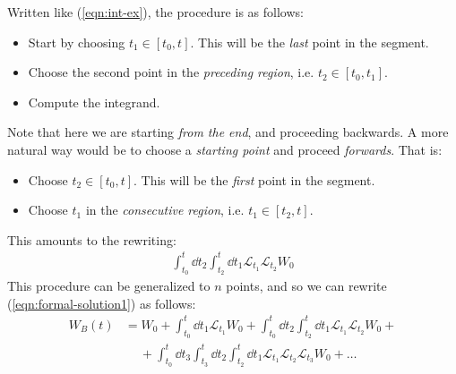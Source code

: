 \documentclass[../template.tex]{subfiles}
\begin{document}
\begin{exo}
\begin{enumerate}
        Written like (\ref{eqn:int-ex}), the procedure is as follows:
        \begin{itemize}
            \item Start by choosing $t_1 \in [t_0,t]$. This will be the \textit{last} point in the segment. 
            \item Choose the second point in the \textit{preceding region}, i.e. $t_2 \in [t_0, t_1]$.
            \item Compute the integrand. 
        \end{itemize}
        Note that here we are starting \textit{from the end}, and proceeding backwards. A more natural way would be to choose a \textit{starting point} and proceed \textit{forwards}. That is:
        \begin{itemize}
            \item Choose $t_2 \in [t_0, t]$. This will be the \textit{first} point in the segment.
            \item Choose $t_1$ in the \textit{consecutive region}, i.e. $t_1 \in [t_2,t]$.   
        \end{itemize}
        This amounts to the rewriting:
        \begin{align*}
            \int_{t_0}^{t} \dd{t_2} \int_{t_2}^{t} \dd{t_1} \mathcal{L}_{t_1} \mathcal{L}_{t_2} W_0
        \end{align*}
        This procedure can be generalized to $n$ points, and so we can rewrite (\ref{eqn:formal-solution1}) as follows:
        \begin{align} \label{eqn:formal-solution2}
            W_B(t)  &= W_0 + \int_{t_0}^t \dd{t_1} \mathcal{L}_{t_1} W_0 + \int_{t_0}^t \dd{t_2} \int_{t_2}^{t} \dd{t_1} \mathcal{L}_{t_1} \mathcal{L}_{t_2} W_0 + \\ \nonumber
            &\quad \> + \int_{t_0}^t \dd{t_3} \int_{t_3}^t \dd{t_2} \int_{t_2}^t \dd{t_1} \mathcal{L}_{t_1} \mathcal{L}_{t_2} \mathcal{L}_{t_3} W_0 + \dots
        \end{align}
        

\end{enumerate}
\end{exo}
\end{document}
